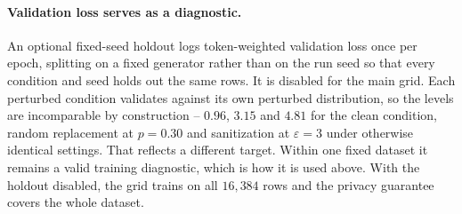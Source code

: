 \paragraph{Validation loss serves as a diagnostic.}
An optional fixed-seed holdout logs token-weighted validation loss once per epoch,
splitting on a fixed generator rather than on the run seed so that every condition and seed holds out the same rows.
It is disabled for the main grid.
Each perturbed condition validates against its own perturbed distribution,
so the levels are incomparable by construction -- $0.96$,
$3.15$ and $4.81$ for the clean condition,
random replacement at $p{=}0.30$ and sanitization at $\varepsilon{=}3$ under otherwise identical settings.
That reflects a different target.
Within one fixed dataset it remains a valid training diagnostic,
which is how it is used above.
With the holdout disabled,
the grid trains on all $16{,}384$ rows and the privacy guarantee covers the whole dataset.

